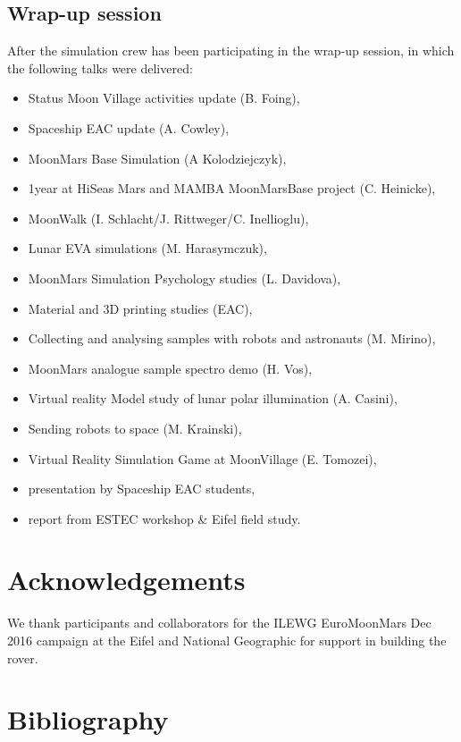 \documentclass[preprint]{elsarticle}
\begin{document}
\subsection{Wrap-up session}
After the simulation crew has been participating in the wrap-up session, in which the following talks were delivered:
\begin{itemize}
\item Status Moon Village activities update (B. Foing),
\item Spaceship EAC update (A. Cowley),
\item MoonMars Base Simulation (A Kolodziejczyk),
\item 1year at HiSeas Mars and MAMBA MoonMarsBase project (C. Heinicke),
\item MoonWalk (I. Schlacht/J. Rittweger/C. Inellioglu),
\item Lunar EVA simulations (M. Harasymczuk),
\item MoonMars Simulation Psychology studies (L. Davidova),
\item Material and 3D printing studies (EAC),
\item Collecting and analysing samples with robots and astronauts (M. Mirino),
\item MoonMars analogue sample spectro demo (H. Vos),
\item Virtual reality Model study of lunar polar illumination (A. Casini),
\item Sending robots to space (M. Krainski),
\item Virtual Reality Simulation Game at MoonVillage (E. Tomozei),
\item presentation by Spaceship EAC students,
\item report from ESTEC workshop & Eifel field study.
\end{itemize}

\section{Acknowledgements}
We thank participants and collaborators for the ILEWG EuroMoonMars Dec 2016 campaign at the Eifel and National Geographic for support in building the rover.

\section*{Bibliography}


\end{document}
